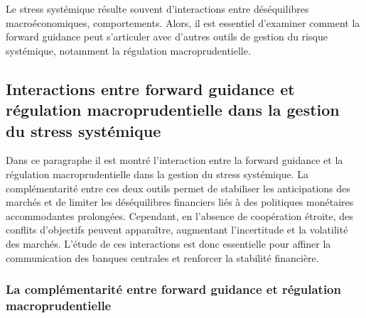 \newpage

Le stress systémique résulte souvent d’interactions entre déséquilibres macroéconomiques, comportements. Alors, il est essentiel d’examiner comment la forward guidance peut s’articuler avec d’autres outils de gestion du risque systémique, notamment la régulation macroprudentielle.

\subsection{Interactions entre forward guidance et régulation macroprudentielle dans la gestion du stress systémique}

Dans ce paragraphe il est montré l’interaction entre la forward guidance et la régulation macroprudentielle dans la gestion du stress systémique. La complémentarité entre ces deux outils permet de stabiliser les anticipations des marchés et de limiter les déséquilibres financiers liés à des politiques monétaires accommodantes prolongées.  Cependant, en l’absence de coopération étroite, des conflits d’objectifs peuvent apparaître, augmentant l’incertitude et la volatilité des marchés. L’étude de ces interactions est donc essentielle pour affiner la communication des banques centrales et renforcer la stabilité financière.

\subsubsection{La complémentarité entre forward guidance et régulation macroprudentielle}

